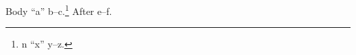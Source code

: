 \documentclass{article}
\begin{document}
Body ``a'' b--c.\footnote{n ``x'' y--z.} After e--f.
\end{document}
